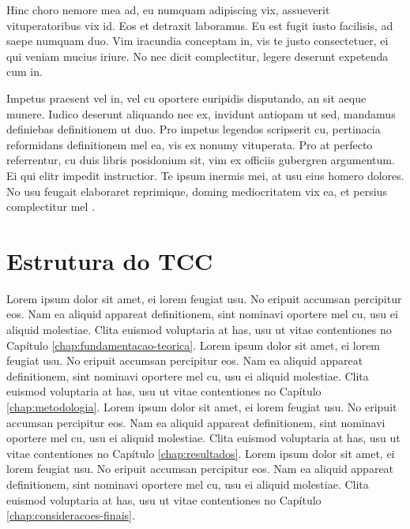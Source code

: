 		Hinc choro nemore mea ad, eu numquam adipiscing vix, assueverit vituperatoribus vix id. Eos et detraxit laboramus. Eu est fugit iusto facilisis, ad saepe numquam duo. Vim iracundia conceptam in, vis te justo consectetuer, ei qui veniam mucius iriure. No nec dicit complectitur, legere deserunt expetenda cum in.

		Impetus praesent vel in, vel cu oportere euripidis disputando, an sit aeque munere. Iudico deserunt aliquando nec ex, invidunt antiopam ut sed, mandamus definiebas definitionem ut duo. Pro impetus legendos scripserit cu, pertinacia reformidans definitionem mel ea, vis ex nonumy vituperata. Pro at perfecto referrentur, cu duis libris posidonium sit, vim ex officiis gubergren argumentum. Ei qui elitr impedit instructior. Te ipsum inermis mei, at usu eius homero dolores. No usu feugait elaboraret reprimique, doming mediocritatem vix ea, et persius complectitur mel \cite{SLatex2015}.

	\section{Estrutura do TCC}
	\label{sec:estrutura-tcc}

		Lorem ipsum dolor sit amet, ei lorem feugiat usu. No eripuit accumsan percipitur eos. Nam ea aliquid appareat definitionem, sint nominavi oportere mel cu, usu ei aliquid molestiae. Clita euismod voluptaria at has, usu ut vitae contentiones no Capítulo \ref{chap:fundamentacao-teorica}. Lorem ipsum dolor sit amet, ei lorem feugiat usu. No eripuit accumsan percipitur eos. Nam ea aliquid appareat definitionem, sint nominavi oportere mel cu, usu ei aliquid molestiae. Clita euismod voluptaria at has, usu ut vitae contentiones no Capítulo \ref{chap:metodologia}. Lorem ipsum dolor sit amet, ei lorem feugiat usu. No eripuit accumsan percipitur eos. Nam ea aliquid appareat definitionem, sint nominavi oportere mel cu, usu ei aliquid molestiae. Clita euismod voluptaria at has, usu ut vitae contentiones no Capítulo \ref{chap:resultados}. Lorem ipsum dolor sit amet, ei lorem feugiat usu. No eripuit accumsan percipitur eos. Nam ea aliquid appareat definitionem, sint nominavi oportere mel cu, usu ei aliquid molestiae. Clita euismod voluptaria at has, usu ut vitae contentiones no Capítulo \ref{chap:consideracoes-finais}.
